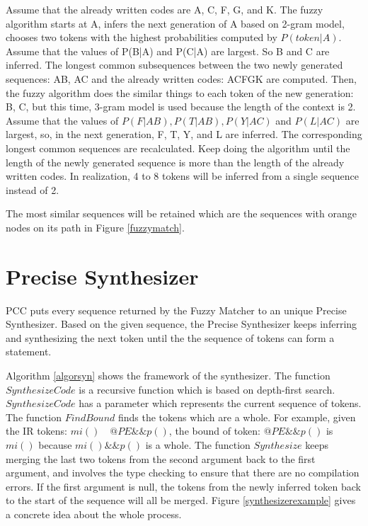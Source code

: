 \documentclass{sig-alternate-05-2015}
\begin{document}
Assume that the already written codes are A, C, F, G, and K. The fuzzy algorithm starts at A, infers the next generation of A based on 2-gram model, chooses two tokens with the highest probabilities computed by $P(token|A)$. Assume that the values of P(B|A) and P(C|A) are largest. So B and C are inferred. The longest common subsequences between the two newly generated sequences: AB, AC and the already written codes: ACFGK are computed. Then, the fuzzy algorithm does the similar things to each token of the new generation: B, C, but this time, 3-gram model is used because the length of the context is 2. Assume that the values of $P(F|AB), P(T|AB), P(Y|AC)$ and $P(L|AC)$ are largest, so, in the next generation, F, T, Y, and L are inferred. The corresponding longest common sequences are recalculated. Keep doing the algorithm until the length of the newly generated sequence is more than the length of the already written codes. In realization, 4 to 8 tokens will be inferred from a single sequence instead of 2.

The most similar sequences will be retained which are the sequences with orange nodes on its path in Figure \ref{fuzzymatch}.

\section{Precise Synthesizer}

PCC puts every sequence returned by the Fuzzy Matcher to an unique Precise Synthesizer. Based on the given sequence, the Precise Synthesizer keeps inferring and synthesizing the next token until the the sequence of tokens can form a statement.


Algorithm \ref{algorsyn} shows the framework of the synthesizer. The function $SynthesizeCode$ is a recursive function which is based on depth-first search. $SynthesizeCode$ has a parameter which represents the current sequence of tokens. The function $FindBound$ finds the tokens which are a whole. For example, given the IR tokens: $mi()\quad @PE\&\&p()$, the bound of token: $@PE\&\&p()$ is $mi()$ because $mi()\&\&p()$ is a whole. The function $Synthesize$ keeps merging the last two tokens from the second argument back to the first argument, and involves the type checking to ensure that there are no compilation errors. If the first argument is null, the tokens from the newly inferred token back to the start of the sequence will all be merged. Figure \ref{synthesizerexample} gives a concrete idea about the whole process.
\end{document}
